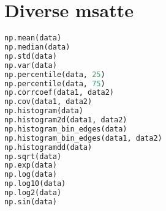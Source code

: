 \documentclass{article}
\begin{document}
\section{Diverse msatte}
\begin{lstlisting}[language=Python]
np.mean(data) 
np.median(data)
np.std(data)
np.var(data) 
np.percentile(data, 25) 
np.percentile(data, 75)
np.corrcoef(data1, data2) 
np.cov(data1, data2) 
np.histogram(data) 
np.histogram2d(data1, data2) 
np.histogram_bin_edges(data) 
np.histogram_bin_edges(data1, data2) 
np.histogramdd(data) 
np.sqrt(data) 
np.exp(data) 
np.log(data) 
np.log10(data) 
np.log2(data) 
np.sin(data) 
\end{lstlisting}
\end{document}
